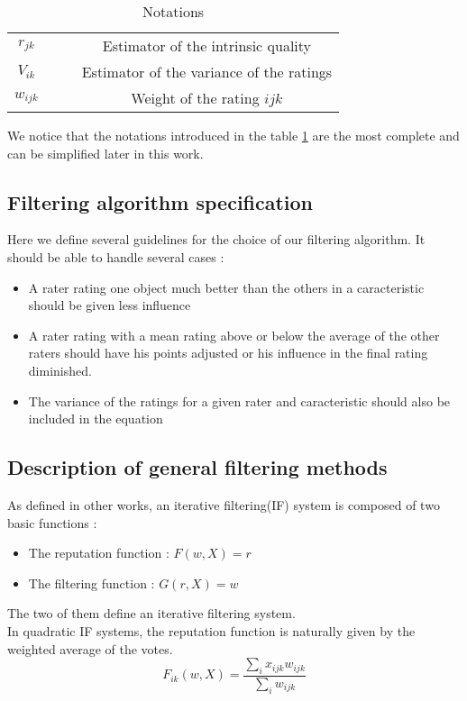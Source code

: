 \begin{table}
\begin{tabular}{|c|c|c|c|}
$r_{jk}$ & & & \parbox[t]{5cm}{Estimator of the intrinsic quality}\\
$V_{ik}$ & & & \parbox[t]{5cm}{Estimator of the variance of the ratings}\\

$w_{ijk}$ & & & \parbox[t]{5cm}{Weight of the rating $ijk$}\\
\hline 

\end{tabular} 
\caption{Notations}\label{table:notation}
\end{table}
We notice that the notations introduced in the table \ref{table:notation} are the most complete and can be simplified later in this work.

\subsection{Filtering algorithm specification}
Here we define several guidelines for the choice of our filtering algorithm. It should be able to handle several cases :
\begin{itemize}
\item A rater rating one object much better than the others in a caracteristic should be given less influence
\item A rater rating with a mean rating above or below the average of the other raters should have his points adjusted or his influence in the final rating diminished.
\item The variance of the ratings for a given rater and caracteristic should also be included in the equation
\end{itemize}



\subsection*{Description of general filtering methods}
As defined in other works, an iterative filtering(IF) system is composed of two basic functions \cite{Cristo1} : 
\begin{itemize}
\item The reputation function : $F(w,X)=r$
\item The filtering function : $G(r,X)=w$
\end{itemize}
The two of them define an iterative filtering system.\\
In quadratic IF systems, the reputation function is naturally given by the weighted average of the votes.
$$F_{ik}(w,X) = \frac{\sum_{i}x_{ijk}w_{ijk}}{\sum_i w_{ijk}}$$

